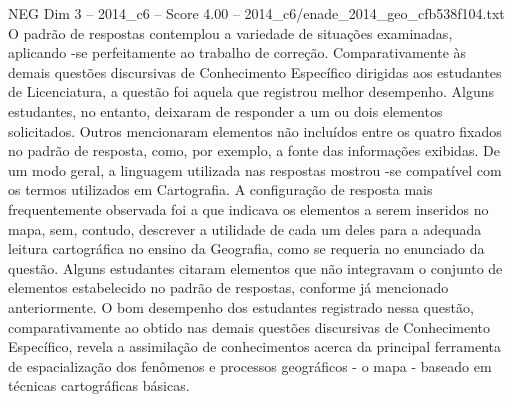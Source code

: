 \begin{textsample}{NEG Dim 3 – 2014\_c6 – Score 4.00 – 2014\_c6/enade\_2014\_geo\_cfb538f104.txt}
O padrão de respostas contemplou a variedade de situações examinadas, aplicando -se perfeitamente ao trabalho de correção.
Comparativamente às demais questões discursivas de Conhecimento Específico dirigidas aos estudantes de Licenciatura, a questão foi aquela que registrou melhor desempenho.
Alguns estudantes, no entanto, deixaram de responder a um ou dois elementos solicitados.
Outros mencionaram elementos não incluídos entre os quatro fixados no padrão de resposta, como, por exemplo, a fonte das informações exibidas.
De um modo geral, a linguagem utilizada nas respostas mostrou -se compatível com os termos utilizados em Cartografia.
A configuração de resposta mais frequentemente observada foi a que indicava os elementos a serem inseridos no mapa, sem, contudo, descrever a utilidade de cada um deles para a adequada leitura cartográfica no ensino da Geografia, como se requeria no enunciado da questão.
Alguns estudantes citaram elementos que não integravam o conjunto de elementos estabelecido no padrão de respostas, conforme já mencionado anteriormente.
O bom desempenho dos estudantes registrado nessa questão, comparativamente ao obtido nas demais questões discursivas de Conhecimento Específico, revela a assimilação de conhecimentos acerca da principal ferramenta de espacialização dos fenômenos e processos geográficos - o mapa - baseado em técnicas cartográficas básicas.

\end{textsample}
